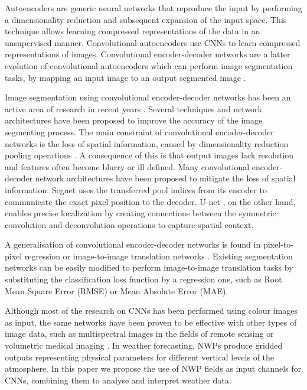 \documentclass[twocol]{ametsoc}
\begin{document}
Autoencoders \citep{hinton2006reducing} are generic neural networks that reproduce the input by performing a dimensionality reduction and subsequent expansion of the input space. This technique allows learning compressed representations of the data in an unsupervised manner. Convolutional autoencoders \citep{masci2011stacked} use CNNs to learn compressed representations of images. Convolutional encoder-decoder networks are a latter evolution of convolutional autoencoders which can perform image segmentation tasks, by mapping an input image to an output segmented image \citep{long2015fully}.

Image segmentation using convolutional encoder-decoder networks has been an active area of research in recent years \citep{krizhevsky2012imagenet,chen2018deeplab}. Several techniques and network architectures have been proposed to improve the accuracy of the image segmenting process. The main constraint of convolutional encoder-decoder networks is the loss of spatial information, caused by dimensionality reduction pooling operations \citep{scherer2010evaluation}. A consequence of this is that output images lack resolution and features often become blurry or ill defined. Many convolutional encoder-decoder network architectures have been proposed to mitigate the loss of spatial information: Segnet \citep{badrinarayanan2017segnet} uses the transferred pool indices from its encoder to communicate the exact pixel position to the decoder. U-net \citep{ronneberger2015u}, on the other hand, enables precise localization by creating connections between the symmetric convolution and deconvolution operations to capture spatial context. 

A generalisation of convolutional encoder-decoder networks is found in pixel-to-pixel regression or image-to-image translation networks \citep{isola2017image}. Existing segmentation networks can be easily modified to perform image-to-image translation tasks by substituting the classification loss function by a regression one, such as Root Mean Square Error (RMSE) or Mean Absolute Error (MAE).

Although most of the research on CNNs has been performed using colour images as input, the same networks have been proven to be effective with other types of image data, such as multispectral images in the fields of remote sensing \citep{hu2015transferring} or volumetric medical imaging \citep{milletari2016v}. In weather forecasting, NWPs produce gridded outputs representing physical parameters for different vertical levels of the atmosphere. In this paper we propose the use of NWP fields as input channels for CNNs, combining them to analyse and interpret weather data.
\end{document}
